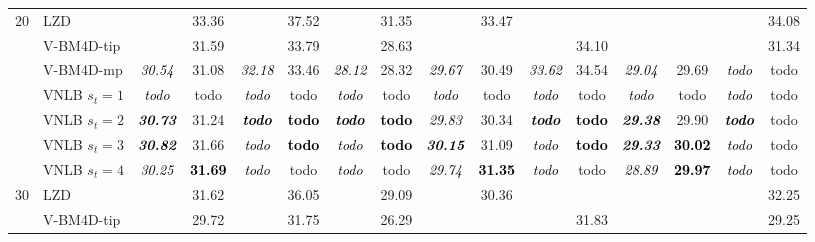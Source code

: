 \documentclass[10pt, journal, twocolumn, final, a4paper]{IEEEtran}
\newcommand{\bsic}[1]{\textcolor{black}{\textit{#1}}}
\newcommand{\Bsic}[1]{\textcolor{black}{\textbf{\textit{#1}}}}
\newcommand{\Best}[1]{\textbf{\textcolor{black}{#1}}}
\begin{document}
\begin{table}[htp!]
\begin{center}
{\begin{tabular}{ c | l |c c | c c | c c | c c | c c | c c | c c}
%
			\multirow{1}{*}{$20$}
			                      & LZD                  & \bsic{     } &       33.36  & \bsic{     } &       37.52   & \bsic{     } &       31.35   & \bsic{     } &       33.47  &              &               &              &              & \bsic{     } &       34.08  \\
			                      & V-BM4D-tip           & \bsic{     } &       31.59  & \bsic{     } &       33.79   & \bsic{     } &       28.63   &              &              &              &       34.10   &              &              & \bsic{     } &       31.34  \\
			                      & V-BM4D-mp            & \bsic{30.54} &       31.08  & \bsic{32.18} &       33.46   & \bsic{28.12} &       28.32   & \bsic{29.67} &       30.49  & \bsic{33.62} &       34.54   & \bsic{29.04} &       29.69  & \bsic{todo } &       todo   \\
			                      & VNLB   $s_t = 1$     & \bsic{todo } &       todo   & \bsic{todo } &       todo    & \bsic{todo } &       todo    & \bsic{todo } &       todo   & \bsic{todo } &       todo    & \bsic{todo } &       todo   & \bsic{todo } &       todo   \\
			                      & VNLB   $s_t = 2$     & \Bsic{30.73} &       31.24  & \Bsic{todo } & \Best{todo }  & \Bsic{todo } & \Best{todo }  & \bsic{29.83} &       30.34  & \Bsic{todo } & \Best{todo }  & \Bsic{29.38} &       29.90  & \Bsic{todo } &       todo   \\
			                      & VNLB   $s_t = 3$     & \Bsic{30.82} &       31.66  & \bsic{todo } & \Best{todo }  & \bsic{todo } & \Best{todo }  & \Bsic{30.15} &       31.09  & \bsic{todo } & \Best{todo }  & \Bsic{29.33} & \Best{30.02} & \bsic{todo } &       todo   \\
			                      & VNLB   $s_t = 4$     & \bsic{30.25} & \Best{31.69} & \bsic{todo } &       todo    & \bsic{todo } &       todo    & \bsic{29.74} & \Best{31.35} & \bsic{todo } &       todo    & \bsic{28.89} & \Best{29.97} & \bsic{todo } &       todo   \\\hline
%
			\multirow{1}{*}{$30$}
			                      & LZD                  & \bsic{     } &       31.62  & \bsic{     } &       36.05   & \bsic{     } &       29.09   & \bsic{     } &       30.36  &              &               &              &              & \bsic{     } &       32.25  \\
			                      & V-BM4D-tip           & \bsic{     } &       29.72  &              &       31.75   & \bsic{     } &       26.29   &              &              &              &       31.83   &              &              & \bsic{     } &       29.25  \\

\end{tabular}}
\end{center}
\end{table}
\end{document}
